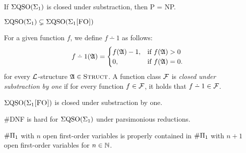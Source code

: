 \begin{theorem} \label{sub-pnp}
	If $\Sigma{\rm QSO}(\Sigma_{1})$ is closed under substraction, then {\sc P} = {\sc NP}.
\end{theorem}

\begin{theorem} \label{sigma1strict}
	$\Sigma{\rm QSO}(\Sigma_{1}) \subsetneq \Sigma{\rm QSO}(\Sigma_{1}\textsc{[FO]})$
\end{theorem}

For a given function $f$, we define $f \dotminus 1$ as follows:
\begin{eqnarray*}
	f \dotminus 1(\A) =
	\begin{cases}
		f(\A)-1, & \text{if }f(\A) > 0 \\
		0, & \text{if }f(\A) = 0.
	\end{cases}
\end{eqnarray*}
for every $\L$-structure $\mathfrak{A} \in \text{\sc Struct}$. A function class $\F$ is {\em closed under substraction by one} if for every function $f \in \F$, it holds that $f \dotminus 1 \in \F$.

\begin{theorem} \label{sigmafo-minusone}
	$\Sigma{\rm QSO}(\Sigma_{1}\textsc{[FO]})$ is closed under substraction by one.
\end{theorem}

\begin{theorem} \label{dnf-pars}
	{\sc \#DNF} is hard for $\Sigma{\rm QSO}(\Sigma_{1})$ under parsimonious reductions. 
\end{theorem}

\begin{theorem} \label{nplusone-strict}
	$\#\Pi_{1}$ with $n$ open first-order variables is properly contained in $\#\Pi_{1}$ with $n+1$ open first-order variables for $n\in\mathbb{N}$.  
\end{theorem}